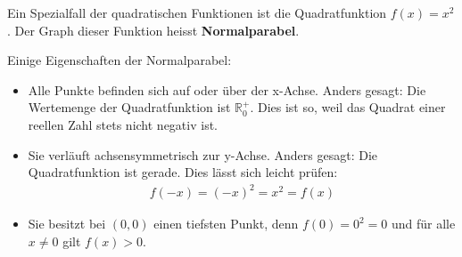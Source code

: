 \begin{deff}[]{}
    Ein Spezialfall der quadratischen Funktionen ist die Quadratfunktion $f(x)=x^2$. Der Graph dieser Funktion heisst \textbf{Normalparabel}.
    \begin{center}
    \end{center}
\end{deff}
Einige Eigenschaften der Normalparabel:
\begin{itemize}
    \item Alle Punkte befinden sich auf oder über der x-Achse. Anders gesagt: Die Wertemenge der Quadratfunktion ist $\mathbb{R}^+_0$. Dies ist so, weil das Quadrat einer reellen Zahl stets nicht negativ ist.
    \item Sie verläuft achsensymmetrisch zur y-Achse. Anders gesagt: Die Quadratfunktion ist gerade. Dies lässt sich leicht prüfen:
          \begin{align*}
              f(-x)=(-x)^2 = x^2 =f(x)
          \end{align*}
    \item Sie besitzt bei $(0,0)$ einen tiefsten Punkt, denn $f(0)=0^2=0$ und für alle $x\neq 0$ gilt $f(x)>0$.
\end{itemize}
